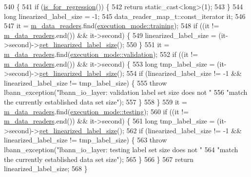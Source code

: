 \begin{DoxyCode}
540                                                   \{
541     \textcolor{keywordflow}{if} (\hyperlink{classlbann_1_1io__layer_a61f2e00334c820235795154492876476}{is\_for\_regression}()) \{
542       \textcolor{keywordflow}{return} \textcolor{keyword}{static\_cast<}\textcolor{keywordtype}{long}\textcolor{keyword}{>}(1);
543     \}
544     \textcolor{keywordtype}{long} linearized\_label\_size = -1;
545     data\_reader\_map\_t::const\_iterator it;
546 
547     it = \hyperlink{classlbann_1_1generic__input__layer_a6bc18860c02beed0252ea3cc87bc48d2}{m\_data\_readers}.find(\hyperlink{base_8hpp_a2781a159088df64ed7d47cc91c4dc0a8ac185ddac8b5a8f5aa23c5b80bc12d214}{execution\_mode::training});
548     \textcolor{keywordflow}{if} ((it != \hyperlink{classlbann_1_1generic__input__layer_a6bc18860c02beed0252ea3cc87bc48d2}{m\_data\_readers}.end()) && it->second) \{
549       linearized\_label\_size = (it->second)->\hyperlink{classlbann_1_1generic__input__layer_ab6c24db7e2b8e73e7d7894e51246dc5e}{get\_linearized\_label\_size}();
550     \}
551     it = \hyperlink{classlbann_1_1generic__input__layer_a6bc18860c02beed0252ea3cc87bc48d2}{m\_data\_readers}.find(\hyperlink{base_8hpp_a2781a159088df64ed7d47cc91c4dc0a8aa617908b172c473cb8e8cda059e55bf0}{execution\_mode::validation});
552     \textcolor{keywordflow}{if} ((it != \hyperlink{classlbann_1_1generic__input__layer_a6bc18860c02beed0252ea3cc87bc48d2}{m\_data\_readers}.end()) && it->second) \{
553       \textcolor{keywordtype}{long} tmp\_label\_size = (it->second)->\hyperlink{classlbann_1_1generic__input__layer_ab6c24db7e2b8e73e7d7894e51246dc5e}{get\_linearized\_label\_size}();
554       \textcolor{keywordflow}{if} (linearized\_label\_size != -1 && linearized\_label\_size != tmp\_label\_size) \{
555         \textcolor{keywordflow}{throw} lbann\_exception(\textcolor{stringliteral}{"lbann\_io\_layer: validation label set size does not "}
556                               \textcolor{stringliteral}{"match the currently established data set size"});
557       \}
558     \}
559     it = \hyperlink{classlbann_1_1generic__input__layer_a6bc18860c02beed0252ea3cc87bc48d2}{m\_data\_readers}.find(\hyperlink{base_8hpp_a2781a159088df64ed7d47cc91c4dc0a8aae2b1fca515949e5d54fb22b8ed95575}{execution\_mode::testing});
560     \textcolor{keywordflow}{if} ((it != \hyperlink{classlbann_1_1generic__input__layer_a6bc18860c02beed0252ea3cc87bc48d2}{m\_data\_readers}.end()) && it->second) \{
561       \textcolor{keywordtype}{long} tmp\_label\_size = (it->second)->\hyperlink{classlbann_1_1generic__input__layer_ab6c24db7e2b8e73e7d7894e51246dc5e}{get\_linearized\_label\_size}();
562       \textcolor{keywordflow}{if} (linearized\_label\_size != -1 && linearized\_label\_size != tmp\_label\_size) \{
563         \textcolor{keywordflow}{throw} lbann\_exception(\textcolor{stringliteral}{"lbann\_io\_layer: testing label set size does not "}
564                               \textcolor{stringliteral}{"match the currently established data set size"});
565       \}
566     \}
567     \textcolor{keywordflow}{return} linearized\_label\_size;
568   \}
\end{DoxyCode}
